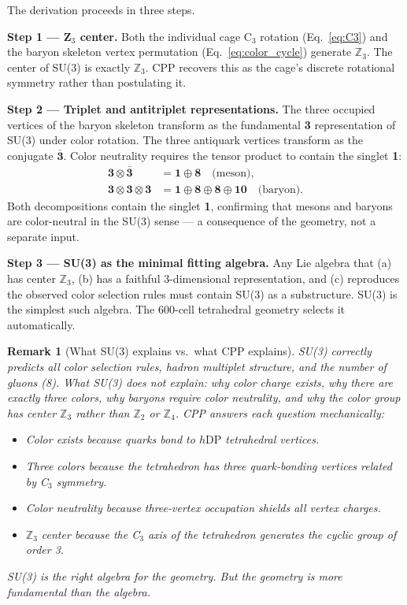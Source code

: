 \documentclass[12pt]{article}
\newtheorem{remark}[theorem]{Remark}
\newcommand{\hDP}{h\mathrm{DP}}
\begin{document}
The derivation proceeds in three steps.

\textbf{Step 1 — Z$_3$ center.}
Both the individual cage C$_3$ rotation (Eq.~\eqref{eq:C3}) and
the baryon skeleton vertex permutation (Eq.~\eqref{eq:color_cycle})
generate $\mathbb{Z}_3$.  The center of SU(3) is exactly
$\mathbb{Z}_3$.  CPP recovers this as the cage's discrete rotational
symmetry rather than postulating it.

\textbf{Step 2 — Triplet and antitriplet representations.}
The three occupied vertices of the baryon skeleton transform as the
fundamental \textbf{3} representation of SU(3) under color rotation.
The three antiquark vertices transform as the conjugate
$\bar{\textbf{3}}$.  Color neutrality requires the tensor product
to contain the singlet \textbf{1}:
\begin{align}
\mathbf{3} \otimes \bar{\mathbf{3}} &= \mathbf{1} \oplus \mathbf{8}
\quad\text{(meson)},\label{eq:meson_decomp}\\
\mathbf{3} \otimes \mathbf{3} \otimes \mathbf{3}
&= \mathbf{1} \oplus \mathbf{8} \oplus \mathbf{8} \oplus \mathbf{10}
\quad\text{(baryon)}.\label{eq:baryon_decomp}
\end{align}
Both decompositions contain the singlet \textbf{1}, confirming that
mesons and baryons are color-neutral in the SU(3) sense --- a
consequence of the geometry, not a separate input.

\textbf{Step 3 — SU(3) as the minimal fitting algebra.}
Any Lie algebra that (a) has center $\mathbb{Z}_3$, (b) has a
faithful 3-dimensional representation, and (c) reproduces the
observed color selection rules must contain SU(3) as a substructure.
SU(3) is the simplest such algebra.  The 600-cell tetrahedral
geometry selects it automatically.

\begin{remark}[What SU(3) explains vs.\ what CPP explains]
SU(3) correctly predicts all color selection rules, hadron multiplet
structure, and the number of gluons (8).  What SU(3) does not explain:
why color charge exists, why there are exactly three colors, why
baryons require color neutrality, and why the color group has center
$\mathbb{Z}_3$ rather than $\mathbb{Z}_2$ or $\mathbb{Z}_4$.  CPP
answers each question mechanically:
\begin{itemize}[noitemsep]
\item Color exists because quarks bond to $\hDP$ tetrahedral vertices.
\item Three colors because the tetrahedron has three quark-bonding
  vertices related by C$_3$ symmetry.
\item Color neutrality because three-vertex occupation shields all
  vertex charges.
\item $\mathbb{Z}_3$ center because the C$_3$ axis of the tetrahedron
  generates the cyclic group of order 3.
\end{itemize}
SU(3) is the right algebra for the geometry.  But the geometry is
more fundamental than the algebra.
\end{remark}
\end{document}
